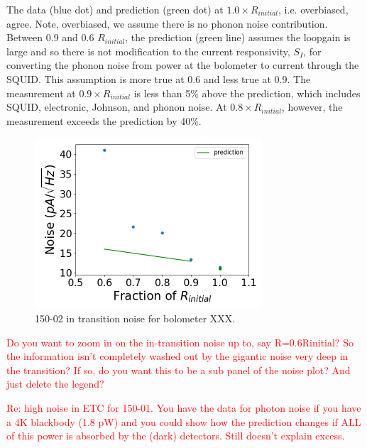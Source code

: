 The data (blue dot) and prediction (green dot) at $1.0 \times R_{initial}$, i.e. overbiased, agree. 
Note, overbiased, we assume there is no phonon noise contribution. 
Between 0.9 and 0.6 $R_{initial}$, the prediction (green line) assumes the loopgain is large and so there is not modification to the current responsivity, $S_{I}$, for converting the phonon noise from power at the bolometer to current through the \ac{SQUID}.
This assumption is more true at 0.6 and less true at 0.9. 
The measurement at $0.9 \times R_{initial}$ is less than 5\% above the prediction, which includes \ac{SQUID}, electronic, Johnson, and phonon noise. 
At $0.8 \times R_{initial}$, however, the measurement exceeds the prediction by 40\%. 


\begin{figure}[ht!]
\begin{center}
\includegraphics[height=2.5in]{figures/150-02_b53w0c0_it_noise.png}
\caption{150-02 in transition noise for bolometer XXX. 
\label{fig:150-02_it_noise} }
\end{center}
\end{figure}


\textcolor{red}{Do you want to zoom in on the in-transition noise up to, say R=0.6Rinitial? So the information isn't completely washed out by the gigantic noise very deep in the transition? If so, do you want this to be a sub panel of the noise plot? And just delete the legend?}

\textcolor{red}{Re: high noise in ETC for 150-01. You have the data for photon noise if you have a 4K blackbody (1.8 pW) and you could show how the prediction changes if ALL of this power is absorbed by the (dark) detectors. Still doesn't explain excess.}







